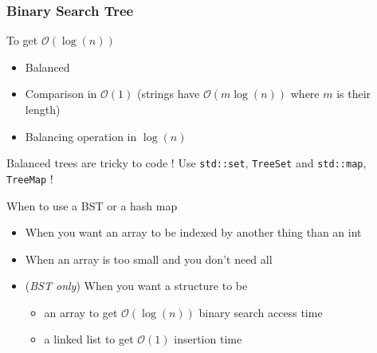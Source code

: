 \documentclass[10pt,svgnames,usenames,table]{beamer} %
\newcommand{\bigoh}{\mathcal{O}}
\begin{document}
\begin{frame}
  \frametitle{Binary Search Tree}
  \begin{center}
\end{center}
  \framebreak

  To get $\bigoh(\log(n))$
  \begin{itemize}
    \item Balanced
    \item Comparison in $\bigoh(1)$ (strings have $\bigoh(m\log(n))$ where $m$ is their length)
    \item Balancing operation in $\log(n)$
  \end{itemize}
  Balanced trees are tricky to code ! Use \lstinline|std::set|, \lstinline|TreeSet| and \lstinline|std::map|, \lstinline|TreeMap| !

  \begin{block}{When to use a BST or a hash map}
    \begin{itemize}
      \item When you want an array to be indexed by another thing than an int %
      \item When an array is too small and you don't need all %
      \item (\emph{BST only})
        When you want a structure to be
        \begin{itemize}
          \item an array to get $\bigoh(\log(n))$ binary search access time
          \item a linked list to get $\bigoh(1)$ insertion time
        \end{itemize}
    \end{itemize}
  \end{block}
\end{frame}
\end{document}
